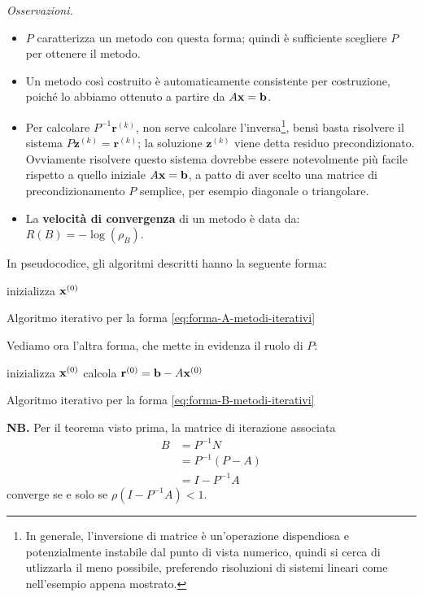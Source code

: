 \textit{Osservazioni.}
\begin{itemize}
\item $P$ caratterizza un metodo con questa forma; quindi è sufficiente scegliere $P$ per ottenere il metodo.
\item Un metodo così costruito è automaticamente consistente per costruzione, poiché lo abbiamo ottenuto a partire da $A\mathbf{x} =\mathbf{b}$.
\item Per calcolare $P^{-1}\mathbf{r}^{(k)}$, non serve calcolare l'inversa\footnote{In generale, l'inversione di matrice è un'operazione dispendiosa e potenzialmente instabile dal punto di vista numerico, quindi si cerca di utlizzarla il meno possibile, preferendo risoluzioni di sistemi lineari come nell'esempio appena mostrato.}, bensì basta risolvere il sistema $P\mathbf{z}^{(k)} =\mathbf{r}^{(k)}$; la soluzione $\mathbf{z}^{(k)}$ viene detta residuo precondizionato.
Ovviamente risolvere questo sistema dovrebbe essere notevolmente più facile rispetto a quello iniziale $A\mathbf{x} =\mathbf{b}$, a patto di aver scelto una matrice di precondizionamento $P$ semplice, per esempio diagonale o triangolare.
\item La \textbf{velocità di convergenza} di un metodo è data da: $R(B) =-\log( \rho _{B})$.
\end{itemize}

In pseudocodice, gli algoritmi descritti hanno la seguente forma: \\
\begin{algo}
	inizializza $\mathbf{x}^{(0)}$\;
	\caption{Algoritmo iterativo per la forma \eqref{eq:forma-A-metodi-iterativi}}
\end{algo}
Vediamo ora l'altra forma, che mette in evidenza il ruolo di $P$: \\
\begin{algo}
	inizializza $\mathbf{x}^{(0)}$\;
	calcola $\mathbf{r}^{(0)} =\mathbf{b} -A\mathbf{x}^{(0)}$\;
	\caption{Algoritmo iterativo per la forma \eqref{eq:forma-B-metodi-iterativi}}
\end{algo}

\textbf{NB.}
Per il teorema visto prima, la matrice di iterazione associata
\begin{align*}
B & =P^{-1} N\\
 & =P^{-1}( P-A)\\
 & =I-P^{-1} A
\end{align*}
converge se e solo se $\rho \left( I-P^{-1} A\right) < 1$.


